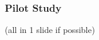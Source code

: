\documentclass[handout,xcolor={dvipsnames}]{beamer}
\begin{document}
%

\begin{frame}
\frametitle{Pilot Study}

(all in 1 slide if possible)

\end{frame}
\end{document}
